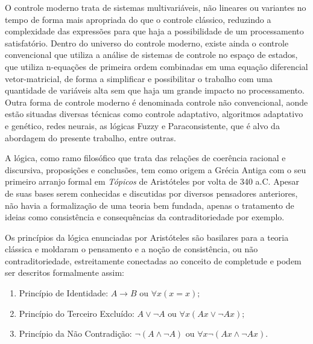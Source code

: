 O controle moderno trata de sistemas multivariáveis, não lineares ou variantes no tempo de forma mais apropriada do que o controle clássico, reduzindo a complexidade das expressões para que haja a possibilidade de um processamento satisfatório.
Dentro do universo do controle moderno, existe ainda o controle convencional que utiliza a análise de sistemas de controle no espaço de estados, que utiliza n-equações de primeira ordem combinadas em uma equação diferencial vetor-matricial, de forma a simplificar e possibilitar o trabalho com uma quantidade de variáveis alta sem que haja um grande impacto no processamento.  \cite{Ogata} 
Outra forma de controle moderno é denominada controle não convencional, aonde estão situadas diversas técnicas como controle adaptativo, algoritmos adaptativo e genético, redes neurais, as lógicas Fuzzy e Paraconsistente, que é alvo da abordagem do presente trabalho, entre outras.

A lógica, como ramo filosófico que trata das relações de coerência racional e discursiva, proposições e conclusões, tem como origem a Grécia Antiga com o seu primeiro arranjo formal em \emph{Tópicos} de Aristóteles por volta de 340 a.C. Apesar de suas bases serem conhecidas e discutidas por diversos pensadores anteriores, não havia a formalização de uma teoria bem fundada, apenas o tratamento de ideias como consistência e consequências da contraditoriedade por exemplo. 

Os princípios da lógica enunciadas por Aristóteles são basilares para a teoria clássica e moldaram o pensamento e a noção de consistência, ou não contraditoriedade, estreitamente conectadas ao conceito de completude e podem ser descritos formalmente assim:


\begin{enumerate}
\item Princípio de Identidade: 
    \begin{math}
	A \rightarrow B 
	\textrm{ ou } 
	\forall x(x=x);
    \end{math}

\item Princípio do Terceiro Excluído:
    \begin{math}
	A \vee \neg A
	\textrm{ ou }
	\forall x(Ax \vee \neg Ax);
    \end{math}

\item Princípio da Não Contradição: 
    \begin{math}
	\neg (A \wedge \neg A)
	\textrm{ ou }
	\forall x\neg(Ax \wedge \neg Ax).
    \end{math}

\end{enumerate}

